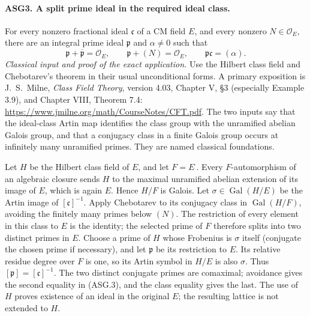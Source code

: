 \documentclass[11pt,a4paper]{article}
\numberwithin{equation}{section}
\theoremstyle{remark}\newtheorem{remark}[theorem]{Remark}
\begin{document}
\paragraph{ASG3. A split prime ideal in the required ideal class.}
\label{claim:ASG3}
For every nonzero fractional ideal \(\mathfrak c\) of a CM
field \(E\), and every nonzero \(N\in\mathcal O_E\), there
are an integral prime ideal \(\mathfrak p\) and \(\alpha\ne0\)
such that
\[
 \mathfrak p+\overline{\mathfrak p}=\mathcal O_E,
 \qquad \mathfrak p+(N)=\mathcal O_E,
 \qquad \mathfrak p\mathfrak c=(\alpha).
\tag{ASG.3}
\]
\emph{Classical input and proof of the exact application.}
Use the Hilbert class field and Chebotarev's theorem in their usual
unconditional forms.  A primary exposition is J.~S.~Milne,
\emph{Class Field Theory}, version 4.03, Chapter V, \S3
(especially Example 3.9), and Chapter VIII, Theorem 7.4:
\url{https://www.jmilne.org/math/CourseNotes/CFT.pdf}.
The two inputs say that the ideal-class Artin map identifies the
class group with the unramified abelian Galois group, and that a
conjugacy class in a finite Galois group occurs at infinitely many
unramified primes.  They are named classical foundations.

Let \(H\) be the Hilbert class field of \(E\), and let
\(F=E^{\bar{\ }}\).  Every \(F\)-automorphism of an algebraic
closure sends \(H\) to the maximal unramified abelian extension
of its image of \(E\), which is again \(E\).  Hence \(H/F\)
is Galois.  Let \(\sigma\in\operatorname{Gal}(H/E)\) be the
Artin image of \([\mathfrak c]^{-1}\).  Apply Chebotarev to
its conjugacy class in \(\operatorname{Gal}(H/F)\), avoiding
the finitely many primes below \((N)\).  The restriction of every
element in this class to \(E\) is the identity; the selected prime
of \(F\) therefore splits into two distinct primes in \(E\).
Choose a prime of \(H\) whose Frobenius is \(\sigma\) itself
(conjugate the chosen prime if necessary), and let \(\mathfrak p\)
be its restriction to \(E\).  Its relative residue degree over
\(F\) is one, so its Artin symbol in \(H/E\) is also
\(\sigma\).  Thus \([\mathfrak p]=[\mathfrak c]^{-1}\).
The two distinct conjugate primes are comaximal; avoidance gives the
second equality in (ASG.3), and the class equality gives the last.
The use of \(H\) proves existence of an ideal in the original
\(E\); the resulting lattice is not extended to \(H\).

\end{document}
